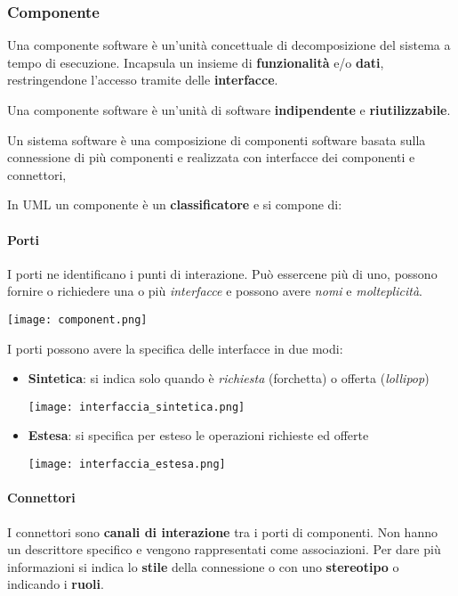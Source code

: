 \subsubsection{Componente}
Una componente software è un'unità concettuale di decomposizione del sistema a tempo di esecuzione. Incapsula un insieme di \textbf{funzionalità} e/o \textbf{dati}, restringendone l'accesso tramite delle \textbf{interfacce}.
\begin{definition}[Componente]
	Una componente software è un'unità di software \textbf{indipendente} e \textbf{riutilizzabile}.
\end{definition}

\begin{definition}
	Un sistema software è una composizione di componenti software basata sulla connessione di più componenti e realizzata con interfacce dei componenti e connettori,
\end{definition}

\noindent In UML un componente è un \textbf{classificatore} e si compone di:
\paragraph{Porti} I porti ne identificano i punti di interazione. Può essercene più di uno, possono fornire o richiedere una o più \textit{interfacce} e possono avere \textit{nomi} e \textit{molteplicità}.
\begin{center}
	\texttt{[image: component.png]}
\end{center}
I porti possono avere la specifica delle interfacce in due modi:
\begin{itemize}
	\item \textbf{Sintetica}: si indica solo quando è \textit{richiesta} (forchetta) o offerta (\textit{lollipop})
	\begin{center}
		\texttt{[image: interfaccia\_sintetica.png]}
	\end{center}
	\item \textbf{Estesa}: si specifica per esteso le operazioni richieste ed offerte
	\begin{center}
		\texttt{[image: interfaccia\_estesa.png]}
	\end{center}
\end{itemize}

\paragraph{Connettori}
I connettori sono \textbf{canali di interazione} tra i porti di componenti. Non hanno un descrittore specifico e vengono rappresentati come associazioni. Per dare più informazioni si indica lo \textbf{stile} della connessione o con uno \textbf{stereotipo} o indicando i \textbf{ruoli}.

